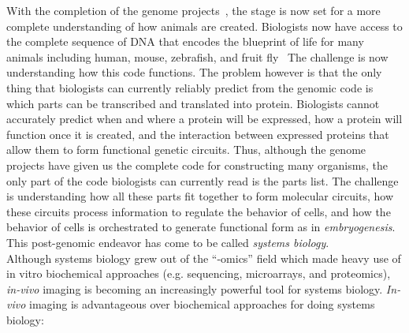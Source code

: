 With the completion of the genome projects~\cite{}, the stage is now set for a
more complete understanding of how animals are created. Biologists now have
access to the complete sequence of DNA that encodes the blueprint of life for
many animals including human, mouse, zebrafish, and fruit
fly~\cite{[2][3][4][5]} The challenge is now understanding how this
code functions. The problem however is that the only thing that biologists can
currently reliably predict from the genomic code is which parts can be
transcribed and translated into protein. Biologists cannot accurately predict
when and where a protein will be expressed, how a protein will
function once it is created, and the interaction between expressed proteins that
allow them to form functional genetic circuits. Thus, although the genome
projects have given us the complete code for constructing many organisms, the
only part of the code biologists can currently read is the parts list. The
challenge is understanding how all these parts fit together to form molecular
circuits, how these circuits process information to regulate the behavior of
cells, and how the behavior of cells is orchestrated to generate functional form
as in \emph{embryogenesis}. This post-genomic endeavor has come to be called
\emph{systems biology}.\\

Although systems biology grew out of the “-omics” field which made heavy use of 
in vitro biochemical approaches (e.g. sequencing, microarrays, and proteomics),
\textit{in-vivo} imaging is becoming an increasingly powerful tool for
systems biology. \textit{In-vivo} imaging is advantageous over
biochemical approaches for doing systems biology:

